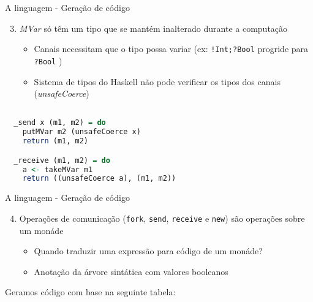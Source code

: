 \begin{frame}[fragile]{A linguagem - Geração de código}
  \begin{enumerate}
    \setcounter{enumi}{2}    
  \item \textit{MVar} só têm um tipo que se mantém inalterado durante a computação
    \begin{itemize}
    \item Canais necessitam que o tipo possa variar (ex:
      \lstinline|!Int;?Bool| progride para \lstinline|?Bool| )
    \item Sistema de tipos do Haskell não pode verificar os tipos dos canais (\textit{unsafeCoerce})
    \end{itemize}
  \end{enumerate}
  \begin{lstlisting}[language=Haskell]

  _send x (m1, m2) = do
    putMVar m2 (unsafeCoerce x)
    return (m1, m2)

  _receive (m1, m2) = do
    a <- takeMVar m1
    return ((unsafeCoerce a), (m1, m2))
\end{lstlisting}
\end{frame}

\begin{frame}[fragile]{A linguagem - Geração de código}
  \begin{enumerate}
    \setcounter{enumi}{3}  
  \item Operações de comunicação (\lstinline|fork|, \lstinline|send|, \lstinline|receive| e \lstinline|new|) são operações sobre um monáde
    \begin{itemize}
    \item Quando traduzir uma expressão para código de um monáde?
    \item Anotação da árvore sintática com valores booleanos
    \end{itemize}
  \end{enumerate}
  Geramos código com base na seguinte tabela:
  \vskip 0.2cm
\end{frame}

